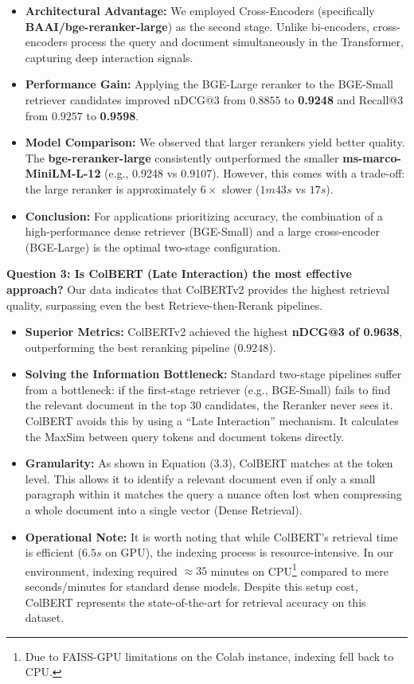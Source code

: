\begin{itemize}
    \item \textbf{Architectural Advantage:} We employed Cross-Encoders (specifically \textbf{BAAI/bge-reranker-large}) as the second stage. Unlike bi-encoders, cross-encoders process the query and document simultaneously in the Transformer, capturing deep interaction signals.
    \item \textbf{Performance Gain:} Applying the BGE-Large reranker to the BGE-Small retriever candidates improved nDCG@3 from $0.8855$ to \textbf{0.9248} and Recall@3 from $0.9257$ to \textbf{0.9598}.
    \item \textbf{Model Comparison:} We observed that larger rerankers yield better quality. The \textbf{bge-reranker-large} consistently outperformed the smaller \textbf{ms-marco-MiniLM-L-12} (e.g., 0.9248 vs 0.9107). However, this comes with a trade-off: the large reranker is approximately $6\times$ slower ($1m43s$ vs $17s$).
    \item \textbf{Conclusion:} For applications prioritizing accuracy, the combination of a high-performance dense retriever (BGE-Small) and a large cross-encoder (BGE-Large) is the optimal two-stage configuration.
\end{itemize}

\textbf{Question 3: Is ColBERT (Late Interaction) the most effective approach?}
Our data indicates that ColBERTv2 provides the highest retrieval quality, surpassing even the best Retrieve-then-Rerank pipelines.

\begin{itemize}
    \item \textbf{Superior Metrics:} ColBERTv2 achieved the highest \textbf{nDCG@3 of 0.9638}, outperforming the best reranking pipeline ($0.9248$).
    \item \textbf{Solving the Information Bottleneck:} Standard two-stage pipelines suffer from a bottleneck: if the first-stage retriever (e.g., BGE-Small) fails to find the relevant document in the top 30 candidates, the Reranker never sees it. ColBERT avoids this by using a ``Late Interaction'' mechanism. It calculates the MaxSim between query tokens and document tokens directly.
    \item \textbf{Granularity:} As shown in Equation (3.3), ColBERT matches at the token level. This allows it to identify a relevant document even if only a small paragraph within it matches the query a nuance often lost when compressing a whole document into a single vector (Dense Retrieval).
    \item \textbf{Operational Note:} It is worth noting that while ColBERT's retrieval time is efficient ($6.5s$ on GPU), the indexing process is resource-intensive. In our environment, indexing required $\approx35$ minutes on CPU\footnote{Due to FAISS-GPU limitations on the Colab instance, indexing fell back to CPU.} compared to mere seconds/minutes for standard dense models. Despite this setup cost, ColBERT represents the state-of-the-art for retrieval accuracy on this dataset.
\end{itemize}


